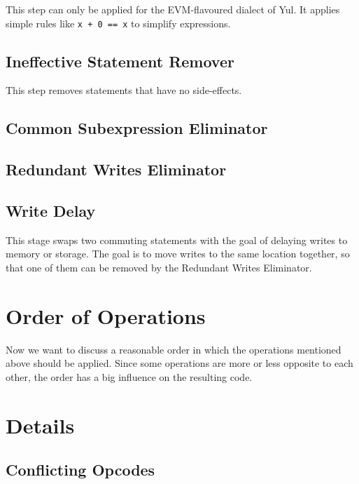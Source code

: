 \documentclass[11pt,letterpaper]{article}
\begin{document}
This step can only be applied for the EVM-flavoured dialect of Yul. It applies
simple rules like \verb|x + 0 == x| to simplify expressions.

\subsection{Ineffective Statement Remover}

This step removes statements that have no side-effects.

\subsection{Common Subexpression Eliminator}

\subsection{Redundant Writes Eliminator}

\subsection{Write Delay}

This stage swaps two commuting statements with the goal of delaying writes to
memory or storage. The goal is to move writes to the same location together,
so that one of them can be removed by the Redundant Writes Eliminator.


\section{Order of Operations}

Now we want to discuss a reasonable order in which
the operations mentioned above should be applied.
Since some operations are more or less opposite to each other,
the order has a big influence on the resulting code.

\section{Details}

\subsection{Conflicting Opcodes}
\end{document}
